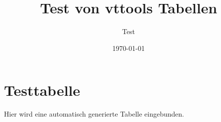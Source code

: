 \documentclass[a4paper,11pt]{article}
\title{Test von vttools Tabellen}
\author{Test}
\date{\today}
\begin{document}
\maketitle

\section{Testtabelle}

Hier wird eine automatisch generierte Tabelle eingebunden.


\end{document}
